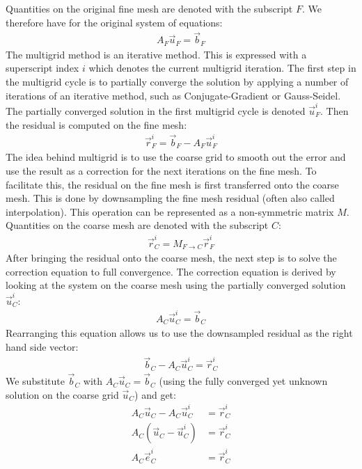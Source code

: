 Quantities on the original fine mesh are denoted with the subscript $F$. We therefore have for the original system of equations:
\begin{align}
\nonumber
A_F\vec{u}_F = \vec{b}_F
\end{align}
The multigrid method is an iterative method. This is expressed with a superscript index $i$ which denotes the current multigrid iteration. The first step in the multigrid cycle is to partially converge the solution by applying a number of iterations of an iterative method, such as Conjugate-Gradient or Gauss-Seidel. The partially converged solution in the first multigrid cycle is denoted $\vec{u}_F^i$. Then the residual is computed on the fine mesh:
\begin{align}
\nonumber
\vec{r}_F^i = \vec{b}_F-A_F\vec{u}_F^i
\end{align}
The idea behind multigrid is to use the coarse grid to smooth out the error and use the result as a correction for the next iterations on the fine mesh. To facilitate this, the residual on the fine mesh is first transferred onto the coarse mesh. This is done by downsampling the fine mesh residual (often also called interpolation). This operation can be represented as a non-symmetric matrix $M$. Quantities on the coarse mesh are denoted with the subscript $C$:
\begin{align}
\nonumber
\vec{r}_C^i = M_{F\rightarrow C} \vec{r}_F^i
\end{align}
After bringing the residual onto the coarse mesh, the next step is to solve the correction equation to full convergence. The correction equation is derived by looking at the system on the coarse mesh using the partially converged solution $\vec{u}_C^i$:
\begin{align}
\nonumber
A_C\vec{u}_C^i = \vec{b}_C
\end{align}
Rearranging this equation allows us to use the downsampled residual as the right hand side vector:
\begin{align}
\nonumber
\vec{b}_C - A_C\vec{u}_C^i = \vec{r}_C^i
\end{align}
We substitute $\vec{b}_C$ with $A_C\vec{u}_C=\vec{b}_C$ (using the fully converged yet unknown solution on the coarse grid $\vec{u}_C$) and get:
\begin{align}
A_C\vec{u}_C - A_C\vec{u}_C^i &= \vec{r}_C^i
\nonumber
\\
A_C\left(\vec{u}_C-\vec{u}_C^i\right) &= \vec{r}_C^i
\nonumber
\\
A_C\vec{e}_C^i &= \vec{r}_C^i
\label{eq:da_correction_equation}
\end{align}
